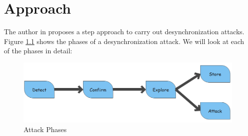 \chapter{Approach}
The author in \cite{b6} proposes a step approach to carry out desynchronization attacks. Figure \ref{fig:Phases} shows the phases of a desynchronization attack. We will look at each of the phases in detail:
\begin{figure}
	\includegraphics[width=14cm]{images/Phases}
	\caption{Attack Phases}
	\label{fig:Phases}
\end{figure}